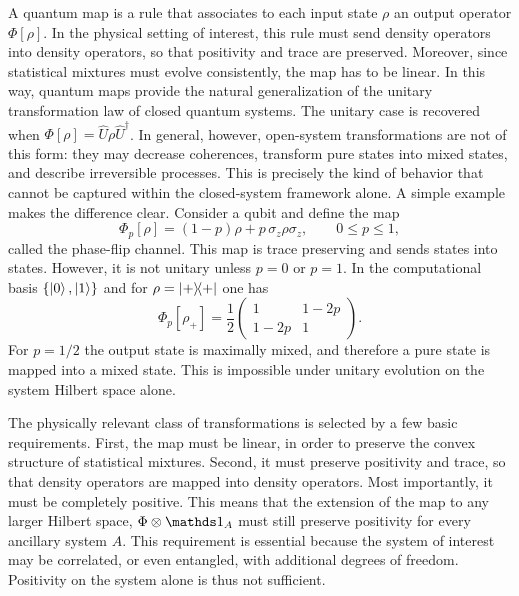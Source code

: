A quantum map is a rule that associates to each input state \(\rho\) an output operator \(\Phi[\rho]\). In the physical setting of interest, this rule must send density operators into density operators, so that positivity and trace are preserved. Moreover, since statistical mixtures must evolve consistently, the map has to be linear. In this way, quantum maps provide the natural generalization of the unitary transformation law of closed quantum systems. The unitary case is recovered when $\Phi[\rho]=\hat U \rho \hat U^\dagger$. In general, however, open-system transformations are not of this form: they may decrease coherences, transform pure states into mixed states, and describe irreversible processes. This is precisely the kind of behavior that cannot be captured within the closed-system framework alone.
A simple example makes the difference clear. 
Consider a qubit and define the map
\begin{equation}
	\Phi_p[\rho]
	=
	(1-p)\rho + p\,\sigma_z \rho \sigma_z,
	\qquad
	0 \leq p \leq 1,
	\label{eq:open_qs_dephasing_channel_definition}
\end{equation}
called the phase-flip channel.
This map is trace preserving and sends states into states. However, it is not unitary unless \(p=0\) or \(p=1\). 
In the computational basis \(\{\ket{0},\ket{1}\}\) and for $\rho = \dyad{+}{+}$ one has
\begin{equation}
	\Phi_p[\rho_+]
	=
	\frac{1}{2}
	\begin{pmatrix}
		1 & 1-2p \\
		1-2p & 1
	\end{pmatrix}.
	\label{eq:open_qs_dephasing_map_matrix_form}
\end{equation}
For \(p=1/2\) the output state is maximally mixed, and therefore a pure state is mapped into a mixed state. This is impossible under unitary evolution on the system Hilbert space alone.

The physically relevant class of transformations is selected by a few basic requirements. First, the map must be linear, in order to preserve the convex structure of statistical mixtures. Second, it must preserve positivity and trace, so that density operators are mapped into density operators. Most importantly, it must be completely positive. This means that the extension of the map to any larger Hilbert space, $\Phi \otimes \id_A$ must still preserve positivity for every ancillary system \(A\). This requirement is essential because the system of interest may be correlated, or even entangled, with additional degrees of freedom. Positivity on the system alone is thus not sufficient.

